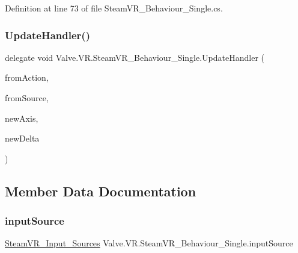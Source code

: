 Definition at line 73 of file Steam\+V\+R\+\_\+\+Behaviour\+\_\+\+Single.\+cs.

\mbox{\label{class_valve_1_1_v_r_1_1_steam_v_r___behaviour___single_ab68f36a28374f77a1aeddacdf2194f52}} 
\subsubsection{\texorpdfstring{UpdateHandler()}{UpdateHandler()}}
{\footnotesize\ttfamily delegate void Valve.\+V\+R.\+Steam\+V\+R\+\_\+\+Behaviour\+\_\+\+Single.\+Update\+Handler (\begin{DoxyParamCaption}\item[{\mbox{\hyperlink{class_valve_1_1_v_r_1_1_steam_v_r___behaviour___single}{Steam\+V\+R\+\_\+\+Behaviour\+\_\+\+Single}}}]{from\+Action,  }\item[{\mbox{\hyperlink{namespace_valve_1_1_v_r_a82e5bf501cc3aa155444ee3f0662853f}{Steam\+V\+R\+\_\+\+Input\+\_\+\+Sources}}}]{from\+Source,  }\item[{float}]{new\+Axis,  }\item[{float}]{new\+Delta }\end{DoxyParamCaption})}



\subsection{Member Data Documentation}
\mbox{\label{class_valve_1_1_v_r_1_1_steam_v_r___behaviour___single_a1898d51e6409a8995ffbbb2d9cb370ba}} 
\subsubsection{\texorpdfstring{inputSource}{inputSource}}
{\footnotesize\ttfamily \mbox{\hyperlink{namespace_valve_1_1_v_r_a82e5bf501cc3aa155444ee3f0662853f}{Steam\+V\+R\+\_\+\+Input\+\_\+\+Sources}} Valve.\+V\+R.\+Steam\+V\+R\+\_\+\+Behaviour\+\_\+\+Single.\+input\+Source}



